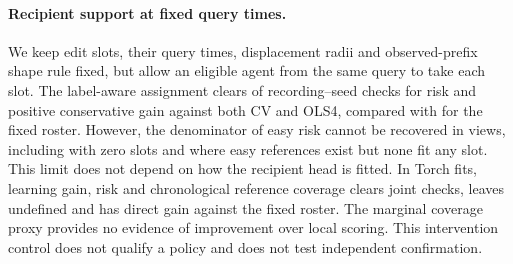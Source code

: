 \paragraph{Recipient support at fixed query times.}
We keep \SlotEdits{} edit slots, their query times, displacement radii and
observed-prefix shape rule fixed, but allow an eligible agent from the same
query to take each slot. The label-aware assignment clears \SlotOracle{} of
\SlotViews{} recording--seed checks for risk and positive conservative gain
against both CV and OLS4, compared with \SlotFrozen{} for the fixed roster.
However, the denominator of easy risk cannot be recovered in \SlotBlocked{}
views, including \SlotEmpty{} with zero slots and \SlotIneligible{} where
easy references exist but none fit any slot. This limit does not depend on
how the recipient head is fitted. In \SlotFits{} Torch fits, learning gain,
risk and chronological reference coverage clears \SlotLearned{} joint
checks, leaves \SlotUndefined{} undefined and has direct gain
\SlotGain{} against the fixed roster. The marginal coverage proxy provides
no evidence of improvement over local scoring. This intervention control
does not qualify a policy and does not test independent confirmation.
